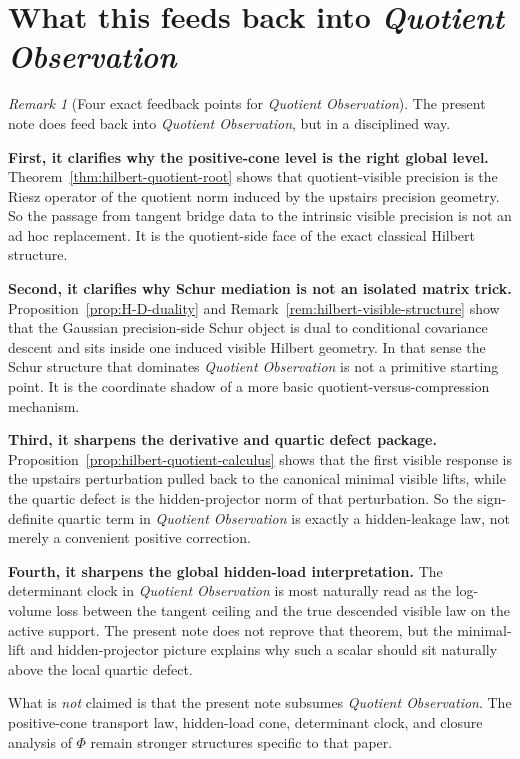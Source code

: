 \documentclass[11pt,a4paper]{article}
\numberwithin{equation}{section}
\theoremstyle{thmcompact}
\theoremstyle{remark}
\newtheorem*{remarkplain}{Remark}
\newenvironment{remark}[1][]%
{\begin{remarkbox}\begin{remarkplain}[#1]\normalfont}
		{\end{remarkplain}\end{remarkbox}}
\begin{document}

\section{What this feeds back into \emph{Quotient Observation}}
\label{sec:feedback-quotient}

\begin{remark}[Four exact feedback points for \emph{Quotient Observation}]\label{rem:feedback-quotient}
The present note does feed back into \emph{Quotient Observation}, but in a disciplined way.

\textbf{First, it clarifies why the positive-cone level is the right global level.} Theorem~\ref{thm:hilbert-quotient-root} shows that quotient-visible precision is the Riesz operator of the quotient norm induced by the upstairs precision geometry. So the passage from tangent bridge data to the intrinsic visible precision is not an ad hoc replacement. It is the quotient-side face of the exact classical Hilbert structure.

\textbf{Second, it clarifies why Schur mediation is not an isolated matrix trick.} Proposition~\ref{prop:H-D-duality} and Remark~\ref{rem:hilbert-visible-structure} show that the Gaussian precision-side Schur object is dual to conditional covariance descent and sits inside one induced visible Hilbert geometry. In that sense the Schur structure that dominates \emph{Quotient Observation} is not a primitive starting point. It is the coordinate shadow of a more basic quotient-versus-compression mechanism.

\textbf{Third, it sharpens the derivative and quartic defect package.} Proposition~\ref{prop:hilbert-quotient-calculus} shows that the first visible response is the upstairs perturbation pulled back to the canonical minimal visible lifts, while the quartic defect is the hidden-projector norm of that perturbation. So the sign-definite quartic term in \emph{Quotient Observation} is exactly a hidden-leakage law, not merely a convenient positive correction.

\textbf{Fourth, it sharpens the global hidden-load interpretation.} The determinant clock in \emph{Quotient Observation} is most naturally read as the log-volume loss between the tangent ceiling and the true descended visible law on the active support. The present note does not reprove that theorem, but the minimal-lift and hidden-projector picture explains why such a scalar should sit naturally above the local quartic defect.

What is \emph{not} claimed is that the present note subsumes \emph{Quotient Observation}. The positive-cone transport law, hidden-load cone, determinant clock, and closure analysis of $\Phi$ remain stronger structures specific to that paper.
\end{remark}
\end{document}
